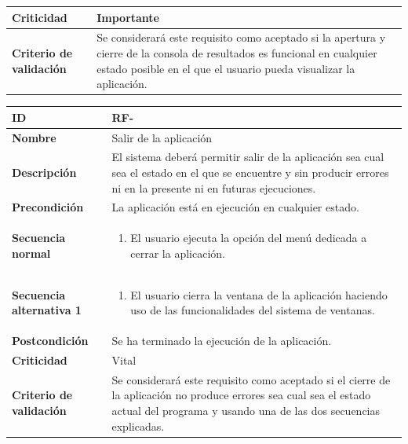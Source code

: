 \begin{center}
\begin{tabular}{ | p{4.7cm} | p{10cm} | }
		\hline 
		\textbf{Criticidad} &
		Importante\\
		
		\hline 
		\textbf{Criterio de validación} & 
		Se considerará este requisito como aceptado si la apertura y cierre de la consola de resultados es funcional en cualquier estado posible en el que el usuario pueda visualizar la aplicación.\\
		
		\hline
	\end{tabular}
\end{center}

\begin{center}
	\begin{tabular}{ | p{4.7cm} | p{10cm} | } 
		\hline
		
		\textbf{ID} & RF-\arabic{contador_requisitos_funcionales}
		{contador_requisitos_funcionales} \\
		
		\hline 
		\textbf{Nombre} &
		Salir de la aplicación\\ 
		
		\hline
		\textbf{Descripción} & 
		El sistema deberá permitir salir de la aplicación sea cual sea el estado en el que se encuentre y sin producir errores ni en la presente ni en futuras ejecuciones.\\
		
		\hline
		\textbf{Precondición} & 
		La aplicación está en ejecución en cualquier estado.\\
		
		\hline
		\textbf{Secuencia normal} &
		\begin{enumerate}
			\item El usuario ejecuta la opción del menú dedicada a cerrar la aplicación.
		\end{enumerate}
		\\
		
		\hline
		\textbf{Secuencia alternativa 1} &
		\begin{enumerate}
			\item El usuario cierra la ventana de la aplicación haciendo uso de las funcionalidades del sistema de ventanas.
		\end{enumerate}
		\\
		
		\hline
		\textbf{Postcondición} & 
		Se ha terminado la ejecución de la aplicación.\\
		
		\hline 
		\textbf{Criticidad} &
		Vital\\
		
		\hline 
		\textbf{Criterio de validación} & 
		Se considerará este requisito como aceptado si el cierre de la aplicación no produce errores sea cual sea el estado actual del programa y usando una de las dos secuencias explicadas.\\
		
		\hline
	\end{tabular}
\end{center}

